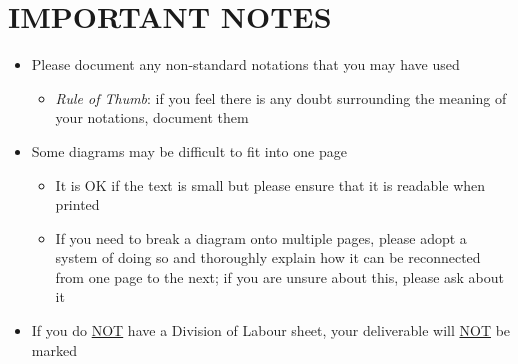 \documentclass[]{article}
\begin{document}
\section*{IMPORTANT NOTES}
\begin{itemize}
	\item Please document any non-standard notations that you may have used
	\begin{itemize}
		\item \emph{Rule of Thumb}: if you feel there is any doubt surrounding the meaning of your notations, document them
	\end{itemize}
	\item Some diagrams may be difficult to fit into one page
	\begin{itemize}
		\item It is OK if the text is small but please ensure that it is readable when printed
		\item If you need to break a diagram onto multiple pages, please adopt a system of doing so and thoroughly explain how it can be reconnected from one page to the next; if you are unsure about this, please ask about it
	\end{itemize}
	\item If you do \underline{NOT} have a Division of Labour sheet, your deliverable will \underline{NOT} be marked
\end{itemize}
\end{document}
